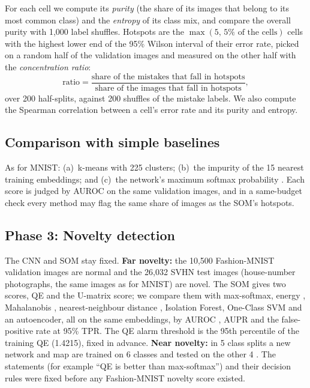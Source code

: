 \documentclass[11pt]{article}
\begin{document}
For each cell we compute its \emph{purity} (the share of its images that belong to its most common class) and the \emph{entropy} of its class mix, and compare the overall purity with 1,000 label shuffles.
Hotspots are the $\max(5,\,5\%\text{ of the cells})$ cells with the highest lower end of the 95\% Wilson interval \parencite{wilson1927probable} of their error rate, picked on a random half of the validation images and measured on the other half with the \emph{concentration ratio}:
\[
\text{ratio}=\frac{\text{share of the mistakes that fall in hotspots}}{\text{share of the images that fall in hotspots}},
\]
over 200 half-splits, against 200 shuffles of the mistake labels. We also compute the Spearman correlation between a cell's error rate and its purity and entropy.

\subsection{Comparison with simple baselines}

As for MNIST: (a)~k-means with 225 clusters; (b)~the impurity of the 15 nearest training embeddings; and (c)~the network's maximum softmax probability \parencite{hendrycks2017baseline}. Each score is judged by AUROC on the same validation images, and in a same-budget check every method may flag the same share of images as the SOM's hotspots.

\subsection{Phase 3: Novelty detection}

The CNN and SOM stay fixed. \textbf{Far novelty:} the 10,500 Fashion-MNIST validation images are normal and the 26,032 SVHN test images \parencite{netzer2011reading} (house-number photographs, the same images as for MNIST) are novel.
The SOM gives two scores, QE and the U-matrix score; we compare them with max-softmax, energy \parencite{liu2020energy}, Mahalanobis \parencite{lee2018mahalanobis}, nearest-neighbour distance \parencite{sun2022knn}, Isolation Forest, One-Class SVM and an autoencoder, all on the same embeddings, by AUROC \parencite{fawcett2006roc}, AUPR \parencite{saito2015pr} and the false-positive rate at 95\% TPR. The QE alarm threshold is the 95th percentile of the training QE (1.4215), fixed in advance.
\textbf{Near novelty:} in 5 class splits a new network and map are trained on 6 classes and tested on the other 4 \parencite{neal2018open}. The statements (for example ``QE is better than max-softmax'') and their decision rules were fixed before any Fashion-MNIST novelty score existed.
\end{document}
